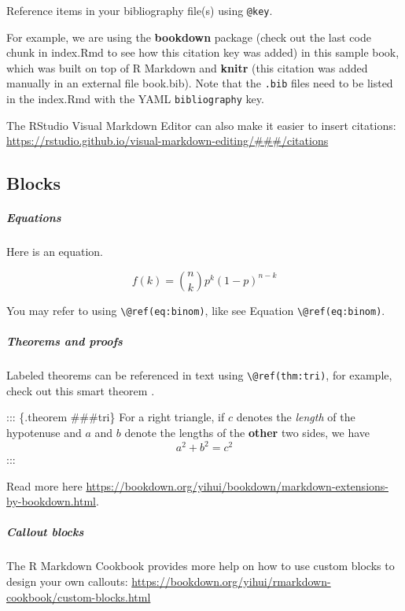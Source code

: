 \documentclass[
]{book}
\begin{document}
{{{Reference items in your bibliography file(s) using \texttt{@key}.

For example, we are using the \textbf{bookdown} package \citep{R-bookdown} (check out the last code chunk in index.Rmd to see how this citation key was added) in this sample book, which was built on top of R Markdown and \textbf{knitr} \citep{xie2015} (this citation was added manually in an external file book.bib).
Note that the \texttt{.bib} files need to be listed in the index.Rmd with the YAML \texttt{bibliography} key.

The RStudio Visual Markdown Editor can also make it easier to insert citations: \url{https://rstudio.github.io/visual-markdown-editing/\#\#\#/citations}

\hypertarget{blocks}{%
\subsection{Blocks}\label{blocks}}

\hypertarget{equations}{%
\subparagraph{Equations}\label{equations}}

Here is an equation.

\begin{equation} 
  f\left(k\right) = \binom{n}{k} p^k\left(1-p\right)^{n-k}
\end{equation}

You may refer to using \texttt{\textbackslash{}@ref(eq:binom)}, like see Equation \texttt{\textbackslash{}@ref(eq:binom)}.

\hypertarget{theorems-and-proofs}{%
\subparagraph{Theorems and proofs}\label{theorems-and-proofs}}

Labeled theorems can be referenced in text using \texttt{\textbackslash{}@ref(thm:tri)}, for example, check out this smart theorem .

::: \{.theorem \#\#\#tri\}
For a right triangle, if \(c\) denotes the \emph{length} of the hypotenuse
and \(a\) and \(b\) denote the lengths of the \textbf{other} two sides, we have
\[a^2 + b^2 = c^2\]
:::

Read more here \url{https://bookdown.org/yihui/bookdown/markdown-extensions-by-bookdown.html}.

\hypertarget{callout-blocks}{%
\subparagraph{Callout blocks}\label{callout-blocks}}

The R Markdown Cookbook provides more help on how to use custom blocks to design your own callouts: \url{https://bookdown.org/yihui/rmarkdown-cookbook/custom-blocks.html}

}}}
\end{document}
